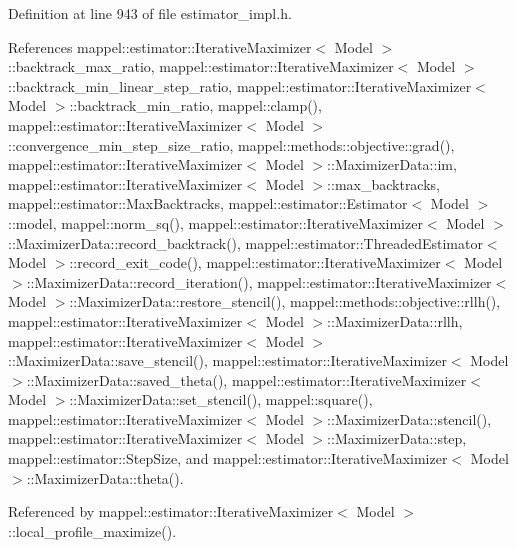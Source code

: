 Definition at line 943 of file estimator\+\_\+impl.\+h.



References mappel\+::estimator\+::\+Iterative\+Maximizer$<$ Model $>$\+::backtrack\+\_\+max\+\_\+ratio, mappel\+::estimator\+::\+Iterative\+Maximizer$<$ Model $>$\+::backtrack\+\_\+min\+\_\+linear\+\_\+step\+\_\+ratio, mappel\+::estimator\+::\+Iterative\+Maximizer$<$ Model $>$\+::backtrack\+\_\+min\+\_\+ratio, mappel\+::clamp(), mappel\+::estimator\+::\+Iterative\+Maximizer$<$ Model $>$\+::convergence\+\_\+min\+\_\+step\+\_\+size\+\_\+ratio, mappel\+::methods\+::objective\+::grad(), mappel\+::estimator\+::\+Iterative\+Maximizer$<$ Model $>$\+::\+Maximizer\+Data\+::im, mappel\+::estimator\+::\+Iterative\+Maximizer$<$ Model $>$\+::max\+\_\+backtracks, mappel\+::estimator\+::\+Max\+Backtracks, mappel\+::estimator\+::\+Estimator$<$ Model $>$\+::model, mappel\+::norm\+\_\+sq(), mappel\+::estimator\+::\+Iterative\+Maximizer$<$ Model $>$\+::\+Maximizer\+Data\+::record\+\_\+backtrack(), mappel\+::estimator\+::\+Threaded\+Estimator$<$ Model $>$\+::record\+\_\+exit\+\_\+code(), mappel\+::estimator\+::\+Iterative\+Maximizer$<$ Model $>$\+::\+Maximizer\+Data\+::record\+\_\+iteration(), mappel\+::estimator\+::\+Iterative\+Maximizer$<$ Model $>$\+::\+Maximizer\+Data\+::restore\+\_\+stencil(), mappel\+::methods\+::objective\+::rllh(), mappel\+::estimator\+::\+Iterative\+Maximizer$<$ Model $>$\+::\+Maximizer\+Data\+::rllh, mappel\+::estimator\+::\+Iterative\+Maximizer$<$ Model $>$\+::\+Maximizer\+Data\+::save\+\_\+stencil(), mappel\+::estimator\+::\+Iterative\+Maximizer$<$ Model $>$\+::\+Maximizer\+Data\+::saved\+\_\+theta(), mappel\+::estimator\+::\+Iterative\+Maximizer$<$ Model $>$\+::\+Maximizer\+Data\+::set\+\_\+stencil(), mappel\+::square(), mappel\+::estimator\+::\+Iterative\+Maximizer$<$ Model $>$\+::\+Maximizer\+Data\+::stencil(), mappel\+::estimator\+::\+Iterative\+Maximizer$<$ Model $>$\+::\+Maximizer\+Data\+::step, mappel\+::estimator\+::\+Step\+Size, and mappel\+::estimator\+::\+Iterative\+Maximizer$<$ Model $>$\+::\+Maximizer\+Data\+::theta().



Referenced by mappel\+::estimator\+::\+Iterative\+Maximizer$<$ Model $>$\+::local\+\_\+profile\+\_\+maximize().

